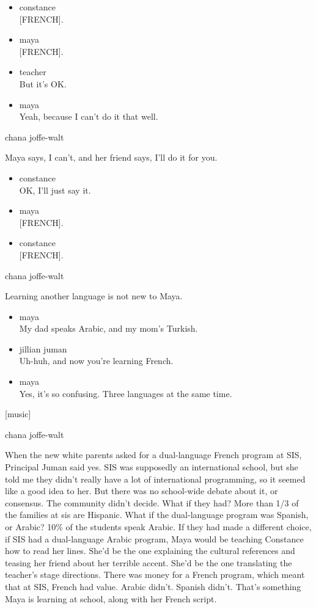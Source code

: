 \begin{itemize}
\item
  constance\\
  {[}FRENCH{]}.
\item
  maya\\
  {[}FRENCH{]}.
\item
  teacher\\
  But it's OK.
\item
  maya\\
  Yeah, because I can't do it that well.
\end{itemize}

chana joffe-walt

Maya says, I can't, and her friend says, I'll do it for you.

\begin{itemize}
\item
  constance\\
  OK, I'll just say it.
\item
  maya\\
  {[}FRENCH{]}.
\item
  constance\\
  {[}FRENCH{]}.
\end{itemize}

chana joffe-walt

Learning another language is not new to Maya.

\begin{itemize}
\item
  maya\\
  My dad speaks Arabic, and my mom's Turkish.
\item
  jillian juman\\
  Uh-huh, and now you're learning French.
\item
  maya\\
  Yes, it's so confusing. Three languages at the same time.
\end{itemize}

{[}music{]}

chana joffe-walt

When the new white parents asked for a dual-language French program at
SIS, Principal Juman said yes. SIS was supposedly an international
school, but she told me they didn't really have a lot of international
programming, so it seemed like a good idea to her. But there was no
school-wide debate about it, or consensus. The community didn't decide.
What if they had? More than 1/3 of the families at sis are Hispanic.
What if the dual-language program was Spanish, or Arabic? 10\% of the
students speak Arabic. If they had made a different choice, if SIS had a
dual-language Arabic program, Maya would be teaching Constance how to
read her lines. She'd be the one explaining the cultural references and
teasing her friend about her terrible accent. She'd be the one
translating the teacher's stage directions. There was money for a French
program, which meant that at SIS, French had value. Arabic didn't.
Spanish didn't. That's something Maya is learning at school, along with
her French script.

